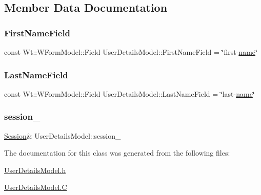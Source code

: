 \subsection{Member Data Documentation}
\mbox{\label{class_user_details_model_a5106e62fceceff6333718c1c88cee6cf}} 
\subsubsection{\texorpdfstring{First\+Name\+Field}{FirstNameField}}
{\footnotesize\ttfamily const Wt\+::\+W\+Form\+Model\+::\+Field User\+Details\+Model\+::\+First\+Name\+Field = \char`\"{}first-\/\hyperlink{_bridge_control_8_c_a8ccf841cb59e451791bcb2e1ac4f1edc}{name}\char`\"{}\hspace{0.3cm}{\ttfamily [static]}}

\mbox{\label{class_user_details_model_a1d1e2d4300151876ed221b080860b004}} 
\subsubsection{\texorpdfstring{Last\+Name\+Field}{LastNameField}}
{\footnotesize\ttfamily const Wt\+::\+W\+Form\+Model\+::\+Field User\+Details\+Model\+::\+Last\+Name\+Field = \char`\"{}last-\/\hyperlink{_bridge_control_8_c_a8ccf841cb59e451791bcb2e1ac4f1edc}{name}\char`\"{}\hspace{0.3cm}{\ttfamily [static]}}

\mbox{\label{class_user_details_model_a97ed29b3f1835399da3765b50f397d5f}} 
\subsubsection{\texorpdfstring{session\+\_\+}{session\_}}
{\footnotesize\ttfamily \hyperlink{class_session}{Session}\& User\+Details\+Model\+::session\+\_\+\hspace{0.3cm}{\ttfamily [private]}}



The documentation for this class was generated from the following files\+:\begin{DoxyCompactItemize}
\item 
\hyperlink{_user_details_model_8h}{User\+Details\+Model.\+h}\item 
\hyperlink{_user_details_model_8_c}{User\+Details\+Model.\+C}\end{DoxyCompactItemize}
